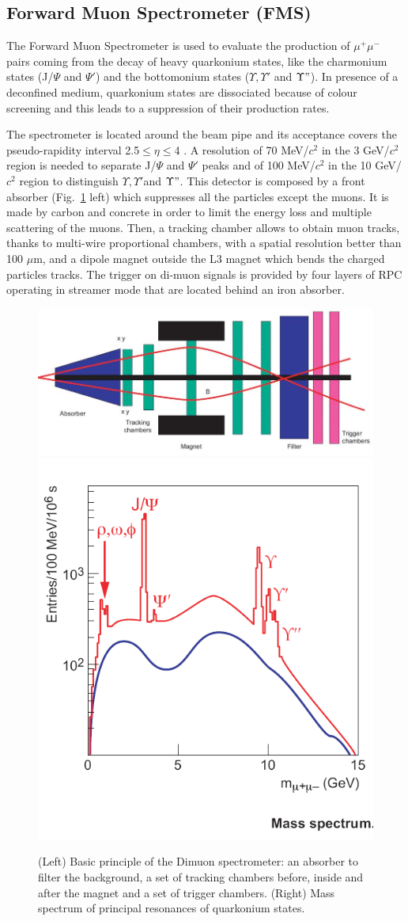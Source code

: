 \subsection{Forward Muon Spectrometer (FMS)}
The Forward Muon Spectrometer is used to evaluate the production of $\mu^+\mu^-$
 pairs coming from the decay of heavy quarkonium states, like the charmonium states 
 (J/$\Psi$ and $\Psi'$) and the bottomonium states ($\Upsilon, \Upsilon'$ and $ \Upsilon"$).
  In presence of a deconfined medium, quarkonium states are dissociated because 
  of colour screening and this leads to a suppression of their production rates.

The spectrometer is located around the beam pipe and its acceptance covers
 the pseudo-rapidity interval 2.5$\leq \eta \leq$4 \cite{FMS-TDR}. A resolution 
 of 70 MeV/$c^2$ in the 3 GeV/$c^2$ region is needed to separate J/$\Psi$ and 
 $\Psi'$ peaks and of 100 MeV/$c^2$ in the 10 GeV/$c^2$ region to distinguish $\Upsilon, \Upsilon' $and $\Upsilon"$.
This detector is composed by a front absorber (Fig.~\ref{fig:muon} left) which 
suppresses all the particles except the muons. It is made by carbon and concrete
 in order to limit the energy loss and multiple scattering of the muons. Then, a tracking 
 chamber allows to obtain muon tracks, thanks to multi-wire proportional chambers, 
 with a spatial resolution better than 100 $\mu$m, and a dipole magnet outside the L3
  magnet which bends the charged particles tracks. The trigger on di-muon signals is 
  provided by four layers of RPC operating in streamer mode that are located behind an iron absorber.
\begin{figure}[!t]
\centering
\includegraphics[width=.49\textwidth]{FigCap3/dimuon1.jpeg}
\includegraphics[width=.49\textwidth]{FigCap3/dimuon2.png}
\caption{(Left) Basic principle of the Dimuon spectrometer: an absorber to filter the background, a set of tracking chambers before, inside and after the magnet and a set of trigger chambers. (Right) Mass spectrum of principal resonances of quarkonium states.}
\label{fig:muon}
\end{figure}
\fi


